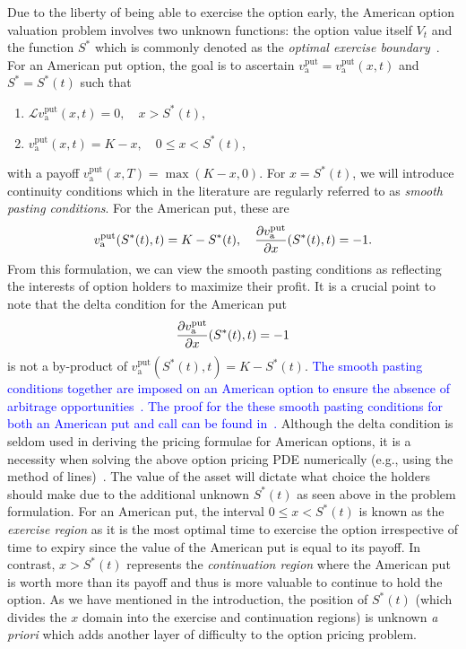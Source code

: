Due to the liberty of being able to exercise the option early, the American option valuation problem involves two unknown functions: the option value itself $V_t$ and
the function $S^*$ which is commonly denoted as the \emph{optimal exercise boundary}~\cite{Kwok2008}. For an American put option, the goal is to ascertain
$v_\text{a}^{\text{put}} =v_\text{a}^{\text{put}}(x,t)$ and $S^* = S^*(t)$ such that
	\begin{enumerate}
			\item $\mathscr{L}v_\text{a}^{\text{put}}(x,t) = 0, \quad x > S^*(t)$,
			\item $v_\text{a}^{\text{put}}(x,t) = K - x, \quad 0 \leq x < S^*(t)$,
	\end{enumerate}
	with a payoff $v_\text{a}^{\text{put}}(x,T) = \max(K-x,0)$. For $x = S^*(t)$, we will introduce continuity conditions which in the literature are regularly referred to as \emph{smooth pasting conditions}. For the American put, these are
		\begin{equation*}
			v_\text{a}^{\text{put}}(S^*(t),t) = K - S^*(t), \quad \frac{\partial v_\text{a}^{\text{put}}}{\partial x}(S^*(t),t) = -1.
		\end{equation*}
	From this formulation, we can view the smooth pasting conditions as reflecting the interests of option holders to maximize their profit. It is a crucial point to note that the delta condition for the American put
	$$
	\frac{\partial v_\text{a}^{\text{put}}}{\partial x}(S^*(t),t) = -1
	$$
is not a by-product of $v_\text{a}^{\text{put}}(S^*(t),t) = K - S^*(t)$. \textcolor{blue}{The smooth pasting conditions together are imposed on an American option to ensure the absence of arbitrage opportunities~\cite{Chiarella2014}. The proof for the these smooth pasting conditions for both an American put and call can be found in~\cite{Chin2017}.} Although the delta condition is seldom used in deriving the pricing formulae for American options, it is a necessity when solving the above option pricing PDE numerically (e.g., using the method of lines)~\cite{Chiarella2010}. The value of the asset will dictate what choice the holders should make due to the additional unknown $S^*(t)$ as seen above in the problem formulation. For an American put, the interval $0 \leq x < S^*(t)$ is known as the \emph{exercise region} as it is the most optimal time to exercise the option irrespective of time to expiry since the value of the American put is equal to its payoff. In contrast, $x > S^*(t)$ represents the \emph{continuation region} where the American put is worth more than its payoff and thus is more valuable to continue to hold the option. As we have mentioned in the introduction, the position of $S^*(t)$ (which divides the $x$ domain into the exercise and continuation regions) is unknown \emph{a priori} which adds another layer of difficulty to the option pricing problem.
	
